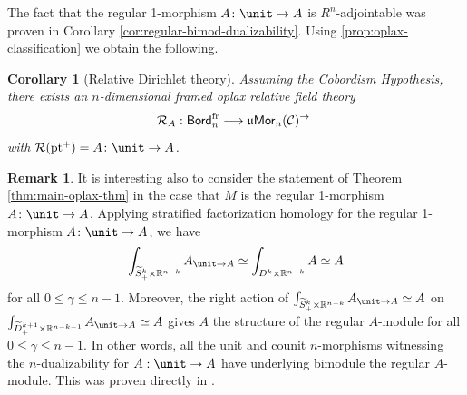 \documentclass[10pt, reqno, twoside
, final
]{amsart}
\numberwithin{equation}{subsection}%
\theoremstyle{definition}
\theoremstyle{definition}
\theoremstyle{definition}
\theoremstyle{definition}
\theoremstyle{definition}
\theoremstyle{definition}
\theoremstyle{definition}
\theoremstyle{definition}
\theoremstyle{definition}
\theoremstyle{plain}
\theoremstyle{definition}
\theoremstyle{plain}
\theoremstyle{definition}
\theoremstyle{plain}
\newtheorem{cor}[defn]{Corollary}
\theoremstyle{definition}
\newtheorem{rmk}[defn]{Remark}
\theoremstyle{definition}
\theoremstyle{plain}
\theoremstyle{plain}
\theoremstyle{definition}
\theoremstyle{plain}
\theoremstyle{plain}
\theoremstyle{plain}
\begin{document}
The fact that the regular 1-morphism $A\colon \unit \to A$ is $R^n$-adjointable was proven in Corollary \ref{cor:regular-bimod-dualizability}. Using \cref{prop:oplax-classification} we obtain the following.

\begin{cor}[Relative Dirichlet theory]
Assuming the Cobordism Hypothesis, there exists an $n$-dimensional framed oplax relative field theory $$\mathcal{R}_{A} : \mathsf{Bord}_{n}^{\text{fr}} \longrightarrow \mathfrak{u}\mathsf{Mor}_{n}(\mathcal{C})^\to\ $$
with $\mathcal{R}(\pt^+) =  A\colon \unit \to A$.
\end{cor}

\begin{rmk}
It is interesting also to consider the statement of Theorem \ref{thm:main-oplax-thm} in the case that $M$ is the regular 1-morphism $A\colon\unit \to A$. Applying  stratified factorization homology for the regular 1-morphism $A\colon \unit \to A$, we have
\begin{equation*}
    \int_{\widetilde{S}^{k}_+  \times \R^{n-k}} A_{\unit \to A} \simeq \int_{D^{k} \times \R^{n-k}} A  \simeq A
\end{equation*}
for all $0\leq \gamma \leq n-1$. Moreover, the right action of  $\int_{\widetilde{S}^{k}_+  \times \R^{n-k}} A_{\unit \to A} \simeq A$ on  $\int_{\widetilde{D}^{k+1}_+ \times \R^{n-k-1}} A_{\unit \to A} \simeq A$ gives $A$ the structure of the regular $A$-module for all  $0\leq \gamma \leq n-1$.  In other words, all the unit and counit $n$-morphisms witnessing the $n$-dualizability for $A:\unit \to A$ have underlying bimodule the regular $A$-module. This was proven directly in .
\end{rmk}























\end{document}

